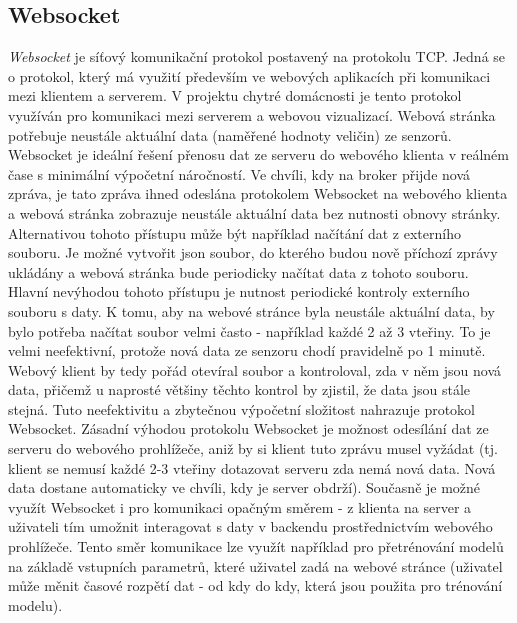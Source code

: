 \subsection*{Websocket} \label{sec:websocket}
\textit{Websocket} \cite{Wikipedia:online} je síťový komunikační protokol postavený na protokolu TCP. Jedná se o protokol, který má využití především ve webových aplikacích při komunikaci mezi klientem a serverem. V projektu chytré domácnosti je tento protokol využíván pro komunikaci mezi serverem a webovou vizualizací. Webová stránka potřebuje neustále aktuální data (naměřené hodnoty veličin) ze senzorů. Websocket je ideální řešení přenosu dat ze serveru do webového klienta v reálném čase s minimální výpočetní náročností. Ve chvíli, kdy na broker přijde nová zpráva, je tato zpráva ihned odeslána protokolem Websocket na webového klienta a webová stránka zobrazuje neustále aktuální data bez nutnosti obnovy stránky. Alternativou tohoto přístupu může být například načítání dat z externího souboru. Je možné vytvořit json soubor, do kterého budou nově příchozí zprávy ukládány a webová stránka bude periodicky načítat data z tohoto souboru. Hlavní nevýhodou tohoto přístupu je nutnost periodické kontroly externího souboru s daty. K tomu, aby na webové stránce byla neustále aktuální data, by bylo potřeba načítat soubor velmi často - například každé 2 až 3 vteřiny. To je velmi neefektivní, protože nová data ze senzoru chodí pravidelně po 1 minutě. Webový klient by tedy pořád otevíral soubor a kontroloval, zda v něm jsou nová data, přičemž u naprosté většiny těchto kontrol by zjistil, že data jsou stále stejná. Tuto neefektivitu a zbytečnou výpočetní složitost nahrazuje protokol Websocket. Zásadní výhodou protokolu Websocket je možnost odesílání dat ze serveru do webového prohlížeče, aniž by si klient tuto zprávu musel vyžádat (tj. klient se nemusí každé 2-3 vteřiny dotazovat serveru zda nemá nová data. Nová data dostane automaticky ve chvíli, kdy je server obdrží). Současně je možné využít Websocket i pro komunikaci opačným směrem - z klienta na server a uživateli tím umožnit interagovat s daty v backendu prostřednictvím webového prohlížeče. Tento směr komunikace lze využít například pro přetrénování modelů na základě vstupních parametrů, které uživatel zadá na webové stránce (uživatel může měnit časové rozpětí dat - od kdy do kdy, která jsou použita pro trénování modelu).